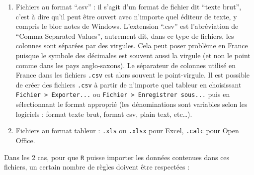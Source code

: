 \documentclass[
  a4paper,
  DIV=11,
  numbers=noendperiod,
  oneside]{scrreprt}
\providecommand{\tightlist}{%
  \setlength{\itemsep}{0pt}\setlength{\parskip}{0pt}}\usepackage{longtable,booktabs,array}
\begin{document}
\begin{enumerate}
\def\labelenumi{\arabic{enumi}.}
\tightlist
\item
  Fichiers au format ``.csv'' : il s'agit d'un format de fichier dit
  ``texte brut'', c'est à dire qu'il peut être ouvert avec n'importe
  quel éditeur de texte, y compris le bloc notes de Windows. L'extension
  ``.csv'' est l'abréviation de ``Comma Separated Values'', autrement
  dit, dans ce type de fichiers, les colonnes sont séparées par des
  virgules. Cela peut poser problème en France puisque le symbole des
  décimales est souvent aussi la virgule (et non le point comme dans les
  pays anglo-saxons). Le séparateur de colonnes utilisé en France dans
  les fichiers \texttt{.csv} est alors souvent le point-virgule. Il est
  possible de créer des fichiers \texttt{.csv} à partir de n'importe
  quel tableur en choisissant
  \texttt{Fichier\ \textgreater{}\ Exporter...} ou
  \texttt{Fichier\ \textgreater{}\ Enregistrer\ sous...} puis en
  sélectionnant le format approprié (les dénominations sont variables
  selon les logiciels : format texte brut, format csv, plain text,
  etc\ldots).
\item
  Fichiers au format tableur : \texttt{.xls} ou \texttt{.xlsx} pour
  Excel, \texttt{.calc} pour Open Office.
\end{enumerate}

Dans les 2 cas, pour que \texttt{R} puisse importer les données
contenues dans ces fichiers, un certain nombre de règles doivent être
respectées :
\end{document}
